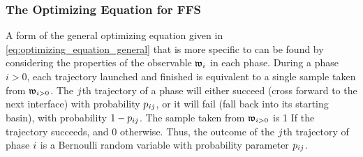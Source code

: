 \subsubsection{The Optimizing Equation for FFS}
\label{sec:opt_eq_for_ffs}
%
%
A form of the general optimizing equation given in \eqref{eq:optimizing_equation_general} that is more specific to  can be found by considering the properties of the observable $\mathfrak{w}_{i}$ in each phase. During a phase $i>0$, each trajectory launched and finished is equivalent to a single sample taken from $\mathfrak{w}_{i>0}$. The $j$th trajectory of a phase will either succeed (\ie cross forward to the next interface) with probability $p_{i j}$, or it will fail (\ie fall back into its starting basin), with probability $1 - p_{i j}$. The sample taken from $\mathfrak{w}_{i>0}$ is 1 If the trajectory succeeds, and 0 otherwise. Thus, the outcome of the $j$th trajectory of phase $i$ is a Bernoulli random variable with probability parameter $p_{i j}$.

